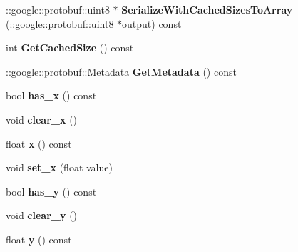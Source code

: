 \begin{DoxyCompactItemize}
\item 
\+::google\+::protobuf\+::uint8 $\ast$ {\bfseries Serialize\+With\+Cached\+Sizes\+To\+Array} (\+::google\+::protobuf\+::uint8 $\ast$output) const \hypertarget{classvss__state_1_1Pose_a468f58ed7eacafe41fd9ae4c57b9e455}{}\label{classvss__state_1_1Pose_a468f58ed7eacafe41fd9ae4c57b9e455}

\item 
int {\bfseries Get\+Cached\+Size} () const \hypertarget{classvss__state_1_1Pose_a97a32d12afefa90b01e0b6ed6713bb18}{}\label{classvss__state_1_1Pose_a97a32d12afefa90b01e0b6ed6713bb18}

\item 
\+::google\+::protobuf\+::\+Metadata {\bfseries Get\+Metadata} () const \hypertarget{classvss__state_1_1Pose_a318666ae85650504a7dd7f2418b01e0c}{}\label{classvss__state_1_1Pose_a318666ae85650504a7dd7f2418b01e0c}

\item 
bool {\bfseries has\+\_\+x} () const \hypertarget{classvss__state_1_1Pose_a60f0b9173d18d8845c77d24e6d76332a}{}\label{classvss__state_1_1Pose_a60f0b9173d18d8845c77d24e6d76332a}

\item 
void {\bfseries clear\+\_\+x} ()\hypertarget{classvss__state_1_1Pose_a4d62819148aa3020a288e9868a0006f3}{}\label{classvss__state_1_1Pose_a4d62819148aa3020a288e9868a0006f3}

\item 
float {\bfseries x} () const \hypertarget{classvss__state_1_1Pose_ab391726391e1e7b9f87e06b7edcc1768}{}\label{classvss__state_1_1Pose_ab391726391e1e7b9f87e06b7edcc1768}

\item 
void {\bfseries set\+\_\+x} (float value)\hypertarget{classvss__state_1_1Pose_aed73f2b005cdb676836600da66a7b8ce}{}\label{classvss__state_1_1Pose_aed73f2b005cdb676836600da66a7b8ce}

\item 
bool {\bfseries has\+\_\+y} () const \hypertarget{classvss__state_1_1Pose_abee5671e3f6cc80e5c71eb157e852f1b}{}\label{classvss__state_1_1Pose_abee5671e3f6cc80e5c71eb157e852f1b}

\item 
void {\bfseries clear\+\_\+y} ()\hypertarget{classvss__state_1_1Pose_adf20a0255b343918c583c1b990422190}{}\label{classvss__state_1_1Pose_adf20a0255b343918c583c1b990422190}

\item 
float {\bfseries y} () const \hypertarget{classvss__state_1_1Pose_a413b079a4e1261a1694c148f7bd8cc76}{}\label{classvss__state_1_1Pose_a413b079a4e1261a1694c148f7bd8cc76}


\end{DoxyCompactItemize}
